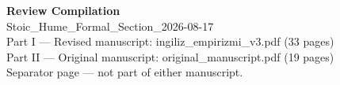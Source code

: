 \documentclass[12pt]{article}
\begin{document}
\begin{center}
{\Large\bfseries Review Compilation}\\[6pt]
Stoic\_Hume\_Formal\_Section\_2026-08-17\\[24pt]
{\large Part I --- Revised manuscript: ingiliz\_empirizmi\_v3.pdf (33 pages)}\\[6pt]
{\large Part II --- Original manuscript: original\_manuscript.pdf (19 pages)}\\[48pt]
{\small Separator page --- not part of either manuscript.}
\end{center}
\end{document}
